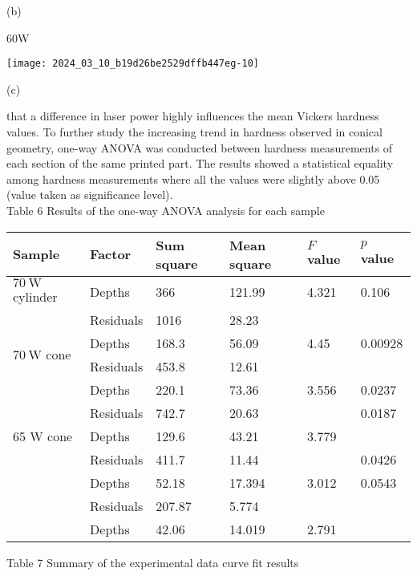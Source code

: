 \documentclass[10pt]{article}
\begin{document}
(b)

60W

\begin{center}
\texttt{[image: 2024\_03\_10\_b19d26be2529dffb447eg-10]}
\end{center}

(c)

that a difference in laser power highly influences the mean Vickers hardness values. To further study the increasing trend in hardness observed in conical geometry, one-way ANOVA was conducted between hardness measurements of each section of the same printed part. The results showed a statistical equality among hardness measurements where all the values were slightly above 0.05 (value taken as significance level).\\
Table 6 Results of the one-way ANOVA analysis for each sample

\begin{center}
\begin{tabular}{llllll}
\hline
Sample & Factor & Sum square & Mean square & $F$ value & $p$ value \\
\hline
$70 \mathrm{~W}$ cylinder & Depths & 366 & 121.99 & 4.321 & 0.106 \\
 & Residuals & 1016 & 28.23 &  &  \\
\multirow{2}{*}{$70 \mathrm{~W}$ cone} & Depths & 168.3 & 56.09 & 4.45 & 0.00928 \\
 & Residuals & 453.8 & 12.61 &  &  \\
 & Depths & 220.1 & 73.36 & 3.556 & 0.0237 \\
 & Residuals & 742.7 & 20.63 &  & 0.0187 \\
65 W cone & Depths & 129.6 & 43.21 & 3.779 &  \\
 & Residuals & 411.7 & 11.44 &  & 0.0426 \\
 & Depths & 52.18 & 17.394 & 3.012 & 0.0543 \\
 & Residuals & 207.87 & 5.774 &  &  \\
 & Depths & 42.06 & 14.019 & 2.791 &  \\
\hline
\end{tabular}
\end{center}

Table 7 Summary of the experimental data curve fit results
\end{document}

